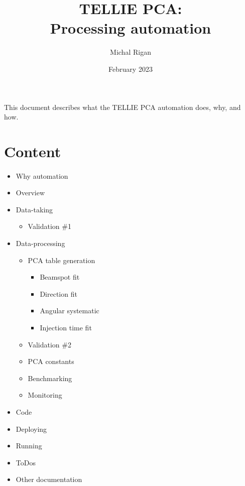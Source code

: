 \documentclass[12pt]{article}
\title{\textbf{TELLIE PCA: \\ Processing automation}}
\date{February 2023}
\author{Michal Rigan}
\begin{document}
\maketitle{}

\vspace{7cm}
\paragraph{}
This document describes what the TELLIE PCA automation does, why, and how.
\clearpage

\tableofcontents

\clearpage

\section{Content}
\paragraph{}
\begin{itemize}
	\item Why automation
	\item Overview
	\item Data-taking
	\begin{itemize}
		\item Validation \#1
	\end{itemize}
	\item Data-processing
	\begin{itemize}
		\item PCA table generation
		\begin{itemize}
			\item Beamspot fit
			\item Direction fit
			\item Angular systematic
			\item Injection time fit
		\end{itemize}
		\item Validation \#2
		\item PCA constants
		\item Benchmarking
		\item Monitoring
	\end{itemize}
	\item Code %
	\item Deploying %
	\item Running
	\item ToDos
	\item Other documentation %
\end{itemize}
\end{document}
